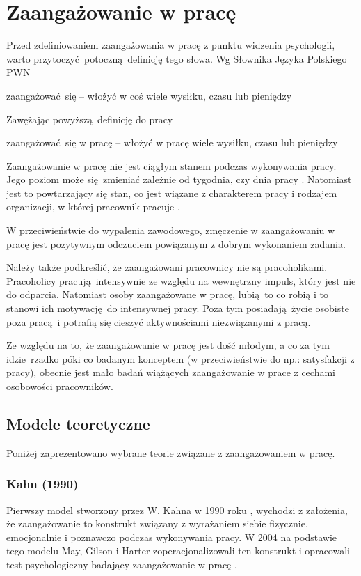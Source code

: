 \chapter{Zaangażowanie w pracę}
\label{sec:theory-eng}
Przed zdefiniowaniem zaangażowania w pracę z punktu widzenia psychologii, warto przytoczyć potoczną definicję tego słowa. Wg Słownika Języka Polskiego PWN
\begin{iquote}
zaangażować się -- włożyć w coś wiele wysiłku, czasu lub pieniędzy \cite{web:pwn-eng}
\end{iquote}
Zawężając powyższą definicję do pracy
\begin{iquote}
zaangażować się w pracę -- włożyć w pracę wiele wysiłku, czasu lub pieniędzy
\end{iquote}

Zaangażowanie w pracę nie jest ciągłym stanem podczas wykonywania pracy. Jego poziom może się zmieniać zależnie od tygodnia, czy dnia pracy \cite{bakker2010weekly}. Natomiast jest to powtarzający się stan, co jest wiązane z charakterem pracy i rodzajem organizacji, w której pracownik pracuje \cite{macey2008meaning}.

W przeciwieństwie do wypalenia zawodowego, zmęczenie w zaangażowaniu w pracę jest pozytywnym odczuciem powiązanym z dobrym wykonaniem zadania.

Należy także podkreślić, że zaangażowani pracownicy nie są pracoholikami. Pracoholicy pracują intensywnie ze względu na wewnętrzny impuls, który jest nie do odparcia. Natomiast osoby zaangażowane w pracę, lubią to co robią i to stanowi ich motywację do intensywnej pracy. Poza tym posiadają życie osobiste poza pracą i potrafią się cieszyć aktywnościami niezwiązanymi z pracą.

Ze względu na to, że zaangażowanie w pracę jest dość młodym, a co za tym idzie rzadko póki co badanym konceptem (w przeciwieństwie do np.: satysfakcji z pracy), obecnie jest mało badań wiążących zaangażowanie w prace z cechami osobowości pracowników.
\section{Modele teoretyczne}
Poniżej zaprezentowano wybrane teorie związane z zaangażowaniem w pracę.

\subsection{Kahn (1990)}
\label{sec:theory-eng-kahn}
Pierwszy model stworzony przez W. Kahna w 1990  roku \cite{kahn1990psychological}, wychodzi z założenia, że zaangażowanie to konstrukt związany z wyrażaniem siebie fizycznie, emocjonalnie i poznawczo podczas wykonywania pracy. W 2004 na podstawie tego modelu May, Gilson i Harter zoperacjonalizowali ten konstrukt i opracowali test psychologiczny badający zaangażowanie w pracę \cite{may2004psychological}.

